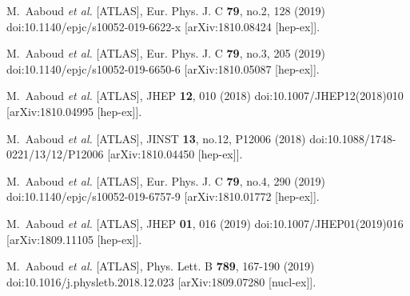 \begin{thebibliography}{9}
M.~Aaboud \textit{et al.} [ATLAS],
Eur. Phys. J. C \textbf{79}, no.2, 128 (2019)
doi:10.1140/epjc/s10052-019-6622-x
[arXiv:1810.08424 [hep-ex]].

M.~Aaboud \textit{et al.} [ATLAS],
Eur. Phys. J. C \textbf{79}, no.3, 205 (2019)
doi:10.1140/epjc/s10052-019-6650-6
[arXiv:1810.05087 [hep-ex]].

M.~Aaboud \textit{et al.} [ATLAS],
JHEP \textbf{12}, 010 (2018)
doi:10.1007/JHEP12(2018)010
[arXiv:1810.04995 [hep-ex]].

M.~Aaboud \textit{et al.} [ATLAS],
JINST \textbf{13}, no.12, P12006 (2018)
doi:10.1088/1748-0221/13/12/P12006
[arXiv:1810.04450 [hep-ex]].

M.~Aaboud \textit{et al.} [ATLAS],
Eur. Phys. J. C \textbf{79}, no.4, 290 (2019)
doi:10.1140/epjc/s10052-019-6757-9
[arXiv:1810.01772 [hep-ex]].

M.~Aaboud \textit{et al.} [ATLAS],
JHEP \textbf{01}, 016 (2019)
doi:10.1007/JHEP01(2019)016
[arXiv:1809.11105 [hep-ex]].

M.~Aaboud \textit{et al.} [ATLAS],
Phys. Lett. B \textbf{789}, 167-190 (2019)
doi:10.1016/j.physletb.2018.12.023
[arXiv:1809.07280 [nucl-ex]].


\end{thebibliography}
